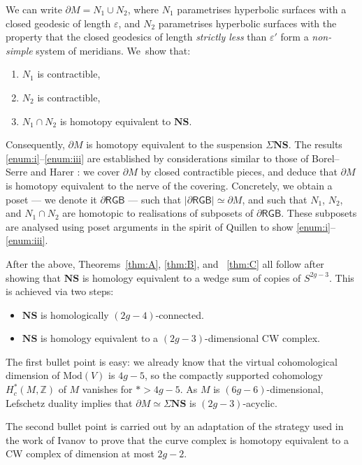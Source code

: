 \documentclass[JEP,XML,SOM,Unicode,NoFloatCountersInSection,published]{cedram}
\newenvironment{enumeratei}
{\bgroup\def\theenumi{\roman{enumi}}\def\theenumii{\arabic{enumii}}\begin{enumerate}}
{\end{enumerate}\egroup}
\theoremstyle{plain}
\theoremstyle{definition}
\let\eps\varepsilon
\newcommand{\Z}{\mathbb Z}
\newcommand{\dRGB}{\partial\mathsf{RGB}}
\newcommand{\compNS}{\mathbf{NS}}
\newcommand{\mcg}{\mathrm{Mod}}
\begin{document}
We can write $\partial M = N_1 \cup N_2$, where $N_1$ parametrises hyperbolic surfaces with a closed geodesic of length $\eps$, and $N_2$ parametrises hyperbolic surfaces with the property that the closed geodesics of length \emph{strictly less} than $\eps'$ form a \emph{non-simple} system of meridians. We~show that:
\begin{enumeratei}
\item\label{enum:i} $N_1$ is contractible,
\item\label{enum:ii} $N_2$ is contractible,
\item\label{enum:iii} $N_1 \cap N_2$ is homotopy equivalent to $\compNS$.
\end{enumeratei}
Consequently, $\partial M$ is homotopy equivalent to the suspension $\Sigma \compNS$. The results \hbox{\eqref{enum:i}--\eqref{enum:iii}} are established by considerations similar to those of Borel--Serre \cite{borelserre} and Harer \cite{harer}: we cover $\partial M$ by closed contractible pieces, and deduce that $\partial M$ is homotopy equivalent to the nerve of the covering.
Concretely, we obtain a poset --- we denote it $\dRGB$ --- such that $|\dRGB| \simeq \partial M$, and such that $N_1$, $N_2$, and $N_1 \cap N_2$ are homotopic to realisations of subposets of $\dRGB$. These subposets are analysed using poset arguments in the spirit of Quillen \cite{quillen-homotopyproperties} to show \eqref{enum:i}--\eqref{enum:iii}.

After the above, Theorems~\ref{thm:A}, \ref{thm:B}, and ~\ref{thm:C} all follow after showing that $\compNS$ is homology equivalent to a wedge sum of copies of $S^{2g-3}$. This is achieved via two steps:
\begin{itemize}
\item $\compNS$ is homologically $(2g-4)$-connected.
\item $\compNS$ is homology equivalent to a $(2g-3)$-dimensional CW complex.
\end{itemize}The first bullet point is easy: we already know that the virtual cohomological dimension of $\mcg(V)$ is $4g-5$, so the compactly supported cohomology $H^\ast_c(M,\Z)$ of $M$ vanishes for $\ast > 4g-5$. As $M$ is $(6g-6)$-dimensional, Lefschetz duality implies that $\partial M \simeq \Sigma \compNS$ is $(2g-3)$-acyclic.

The second bullet point is carried out by an adaptation of the strategy used in the work of Ivanov \cite{ivanov} to prove that the curve complex is homotopy equivalent to a CW complex of dimension at most $2g-2$.
\end{document}
